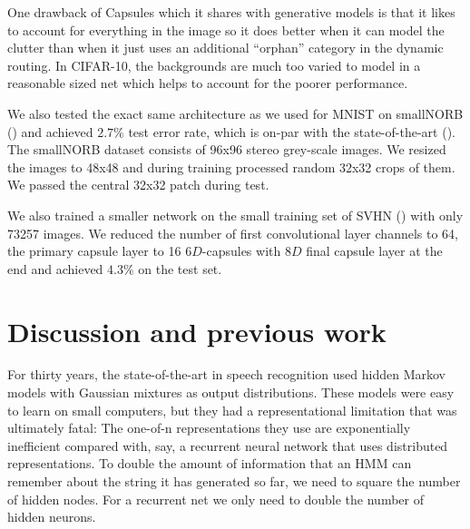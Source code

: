 \documentclass{article}
\begin{document}
 One drawback of Capsules which it shares with generative models is that it likes to account for everything in the image so it does better when it can model the clutter than when it just uses an additional “orphan” category in the dynamic routing. In CIFAR-10, the backgrounds are much too varied to model in a reasonable sized net which helps to account for the poorer performance.

We also tested the exact same architecture as we used for MNIST on smallNORB (\cite{lecun2004learning}) and achieved $2.7\%$ test error rate, which is on-par with the state-of-the-art (\cite{cirecsan2011high}). The smallNORB dataset consists of 96x96 stereo grey-scale images. We resized the images to 48x48 and during training processed random 32x32 crops of them. We passed the central 32x32 patch during test. 

We also trained a smaller network on the small training set of SVHN (\cite{netzer2011reading}) with only 73257 images. We reduced the number of first convolutional layer channels to 64, the primary capsule layer to 16 $6D$-capsules with $8D$ final capsule layer at the end and achieved $4.3\%$ on the test set. 


\section{Discussion and previous work}

For thirty years, the state-of-the-art in speech recognition used hidden Markov models with Gaussian mixtures as output distributions. These models were easy to learn on small computers, but they had a representational limitation that was ultimately fatal: The one-of-n representations they use are exponentially inefficient compared with, say, a recurrent neural network that uses distributed representations. To double the amount of information that an HMM can remember about the string it has generated so far, we need to square the number of hidden nodes.  For a recurrent net we only need to double the number of hidden neurons.  
\end{document}
